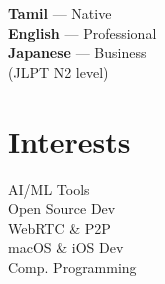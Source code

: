 \documentclass[9.5pt, a4paper]{article}
\begin{document}
\begin{minipage}[t]{0.28\linewidth}
{\footnotesize\color{darkgray}
\textbf{Tamil} --- Native\\[2pt]
\textbf{English} --- Professional\\[2pt]
\textbf{Japanese} --- Business\\
\phantom{x}(JLPT N2 level)
}

\vspace{4pt}

\section{Interests}

{\footnotesize\color{darkgray}
AI/ML Tools\\[2pt]
Open Source Dev\\[2pt]
WebRTC \& P2P\\[2pt]
macOS \& iOS Dev\\[2pt]
Comp. Programming
}

\end{minipage}
\hfill
\end{document}
